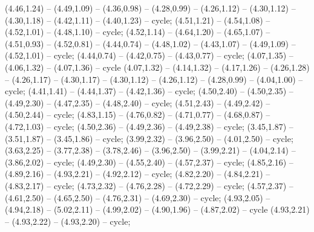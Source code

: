 { (4.46,1.24) -- (4.49,1.09) -- (4.36,0.98) -- (4.28,0.99) -- (4.26,1.12) -- (4.30,1.12) -- (4.30,1.18) -- (4.42,1.11) -- (4.40,1.23) -- cycle;
 (4.51,1.21) -- (4.54,1.08) -- (4.52,1.01) -- (4.48,1.10) -- cycle;
 (4.52,1.14) -- (4.64,1.20) -- (4.65,1.07) -- (4.51,0.93) -- (4.52,0.81) -- (4.44,0.74) -- (4.48,1.02) -- (4.43,1.07) -- (4.49,1.09) -- (4.52,1.01) -- cycle;
 (4.44,0.74) -- (4.42,0.75) -- (4.43,0.77) -- cycle;
 (4.07,1.35) -- (4.06,1.32) -- (4.07,1.36) -- cycle (4.07,1.32) -- (4.14,1.32) -- (4.17,1.26) -- (4.26,1.28) -- (4.26,1.17) -- (4.30,1.17) -- (4.30,1.12) -- (4.26,1.12) -- (4.28,0.99) -- (4.04,1.00) -- cycle;
 (4.41,1.41) -- (4.44,1.37) -- (4.42,1.36) -- cycle;
 (4.50,2.40) -- (4.50,2.35) -- (4.49,2.30) -- (4.47,2.35) -- (4.48,2.40) -- cycle;
 (4.51,2.43) -- (4.49,2.42) -- (4.50,2.44) -- cycle;
 (4.83,1.15) -- (4.76,0.82) -- (4.71,0.77) -- (4.68,0.87) -- (4.72,1.03) -- cycle;
 (4.50,2.36) -- (4.49,2.36) -- (4.49,2.38) -- cycle;
 (3.45,1.87) -- (3.51,1.87) -- (3.45,1.86) -- cycle;
 (3.99,2.32) -- (3.96,2.50) -- (4.01,2.50) -- cycle;
 (3.63,2.25) -- (3.77,2.38) -- (3.78,2.46) -- (3.96,2.50) -- (3.99,2.21) -- (4.04,2.14) -- (3.86,2.02) -- cycle;
 (4.49,2.30) -- (4.55,2.40) -- (4.57,2.37) -- cycle;
 (4.85,2.16) -- (4.89,2.16) -- (4.93,2.21) -- (4.92,2.12) -- cycle;
 (4.82,2.20) -- (4.84,2.21) -- (4.83,2.17) -- cycle;
 (4.73,2.32) -- (4.76,2.28) -- (4.72,2.29) -- cycle;
 (4.57,2.37) -- (4.61,2.50) -- (4.65,2.50) -- (4.76,2.31) -- (4.69,2.30) -- cycle;
 (4.93,2.05) -- (4.94,2.18) -- (5.02,2.11) -- (4.99,2.02) -- (4.90,1.96) -- (4.87,2.02) -- cycle (4.93,2.21) -- (4.93,2.22) -- (4.93,2.20) -- cycle;
}
